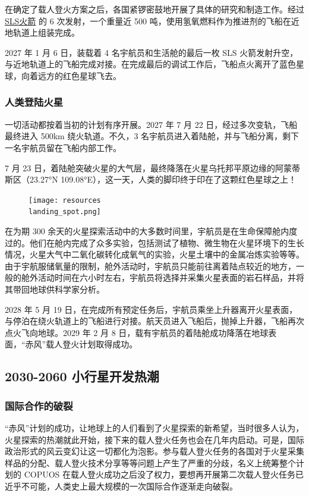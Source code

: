 \documentclass[letterpaper,10pt]{sphinxmanual}
\begin{document}
在确定了载人登火方案之后，各国紧锣密鼓地开展了具体的研究和制造工作。经过 \href{http://en.wikipedia.org/wiki/Space\_Launch\_System}{SLS火箭} 的 6 次发射，一个重量近 500 吨，使用氢氧燃料作为推进剂的飞船在近地轨道上组装完成。

2027 年 1 月 6 日，装载着 4 名宇航员和生活舱的最后一枚 SLS 火箭发射升空，与近地轨道上的飞船完成对接。在完成最后的调试工作后，飞船点火离开了蓝色星球，向着远方的红色星球飞去。
\begin{figure}[htbp]
\centering
\end{figure}


\subsubsection{人类登陆火星}
\label{history:id5}
一切活动都按着当初的计划有序开展。2027 年 7 月 22 日，经过多次变轨，飞船最终进入 500km 绕火轨道。不久，3 名宇航员进入着陆舱，并与飞船分离，剩下一名宇航员留在飞船内部工作。

7 月 23 日，着陆舱突破火星的大气层，最终降落在火星乌托邦平原边缘的阿蒙蒂斯区（23.27°N 109.08°E），这一天，人类的脚印终于印在了这颗红色星球之上！
\begin{figure}[htbp]
\centering

\texttt{[image: resources\\landing\_spot.png]}
\end{figure}

在为期 300 余天的火星探索活动中的大多数时间里，宇航员是在生命保障舱内度过的。他们在舱内完成了众多实验，包括测试了植物、微生物在火星环境下的生长情况，火星大气中二氧化碳转化成氧气的实验，火星土壤中的金属冶炼实验等等。由于宇航服储氧量的限制，舱外活动时，宇航员只能前往离着陆点较近的地方，一般的舱外活动时间在六小时左右，宇航员将选择并采集火星表面的岩石样品，并将其带回地球供科学家分析。

2028 年 5 月 19 日，在完成所有预定任务后，宇航员乘坐上升器离开火星表面，与停泊在绕火轨道上的飞船进行对接。航天员进入飞船后，抛掉上升器，飞船再次点火飞向地球。2029 年 2 月 8 日，载有宇航员的着陆舱成功降落在地球表面，“赤风”载人登火计划取得成功。


\subsection{2030-2060 小行星开发热潮}
\label{history:id6}

\subsubsection{国际合作的破裂}
\label{history:id7}
“赤风”计划的成功，让地球上的人们看到了火星探索的新希望，当时很多人认为，火星探索的热潮就此开始，接下来的载人登火任务也会在几年内启动。可是，国际政治形式的风云变幻让这一切都化为泡影。参与载人登火任务的各国对于火星采集样品的分配、载人登火技术分享等等问题上产生了严重的分歧，名义上统筹整个计划的 COPUOS 在载人登火成功之后没了权力，要想再开展第二次载人登火任务已近乎不可能，人类史上最大规模的一次国际合作逐渐走向破裂。
\end{document}
